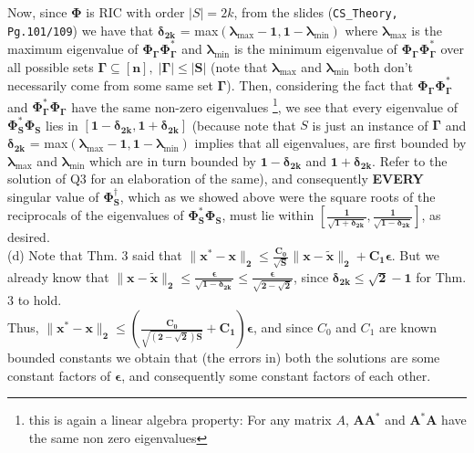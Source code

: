 \documentclass[a4paper,11pt]{article}
\numberwithin{definition}{section}
\numberwithin{mytheorem}{subsection}
\begin{document}
Now, since $\boldsymbol{\Phi}$ is RIC with order $|S| = 2k$, from the slides (\texttt{CS\_Theory, Pg.101/109}) we have that $\boldsymbol{\delta_{2k}}$ = max$\boldsymbol{(\lambda_{\mathrm{max}}-1, 1-\lambda_{\mathrm{min}})}$ where $\boldsymbol{\lambda_{\mathrm{max}}}$ is the maximum eigenvalue of $\boldsymbol{\Phi_{\Gamma}\Phi_{\Gamma}^*}$ and $\boldsymbol{\lambda_{\mathrm{min}}}$ is the minimum eigenvalue of $\boldsymbol{\Phi_{\Gamma}\Phi_{\Gamma}^*}$ over all possible sets $\boldsymbol{\Gamma\subseteq[n],\;|\Gamma| \leq |S|}$ (note that $\boldsymbol{\lambda_{\mathrm{max}}}$ and $\boldsymbol{\lambda_{\mathrm{min}}}$ both don't necessarily come from some same set $\boldsymbol{\Gamma}$). Then, considering the fact that $\boldsymbol{\Phi_{\Gamma}\Phi_{\Gamma}^*}$ and $\boldsymbol{\Phi_{\Gamma}^*\Phi_{\Gamma}}$ have the same non-zero eigenvalues \footnote{this is again a linear algebra property: For any matrix $A$, $\boldsymbol{AA^*}$ and $\boldsymbol{A^*A}$ have the same non zero eigenvalues}, we see that every eigenvalue of $\boldsymbol{\Phi_S^*\Phi_S}$ lies in $\boldsymbol{[1-\delta_{2k}, 1+\delta_{2k}]}$ (because note that $S$ is just an instance of $\boldsymbol{\Gamma}$ and  $\boldsymbol{\delta_{2k}}$ = max$\boldsymbol{(\lambda_{\mathrm{max}}-1, 1-\lambda_{\mathrm{min}})}$ implies that all eigenvalues, are first bounded by $\boldsymbol{\lambda_{\mathrm{max}}}$ and $\boldsymbol{\lambda_{\mathrm{min}}}$ which are in turn bounded by $\boldsymbol{1-\delta_{2k}}$ and $\boldsymbol{1+\delta_{2k}}$. Refer to the solution of Q3 for an elaboration of the same), and consequently \textbf{EVERY} singular value of $\boldsymbol{\Phi_S^{\dagger}}$, which as we showed above were the square roots of the reciprocals of the eigenvalues of $\boldsymbol{\Phi_S^*\Phi_S}$, must lie within $\boldsymbol{[\frac{1}{\sqrt{1+\delta_{2k}}}, \frac{1}{\sqrt{1-\delta_{2k}}}]}$, as desired.
\\
(d) Note that Thm. 3 said that $\boldsymbol{\lVert x^* - x\rVert_2\leq\frac{C_0}{\sqrt{S}}\lVert x-\widetilde{x}\rVert_2 + C_1\epsilon}$. But we already know that $\boldsymbol{\lVert x-\widetilde{x}\rVert_2\leq\frac{\epsilon}{\sqrt{1-\delta_{2k}}}\leq\frac{\epsilon}{\sqrt{2-\sqrt{2}}}}$, since $\boldsymbol{\delta_{2k} \leq \sqrt{2} - 1}$ for Thm. 3 to hold.\\
Thus, $\boldsymbol{\lVert x^* - x\rVert_2\leq(\frac{C_0}{\sqrt{(2-\sqrt{2})S}} + C_1)\epsilon}$, and since $C_0$ and $C_1$ are known bounded constants we obtain that (the errors in) both the solutions are some constant factors of $\boldsymbol{\epsilon}$, and consequently some constant factors of each other.
\end{document}
